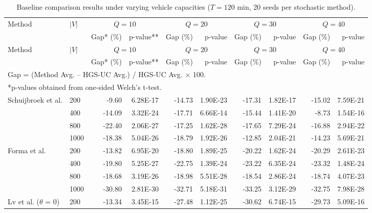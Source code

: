 \documentclass[11pt]{article}
\numberwithin{table}{section}
\numberwithin{figure}{section}
\begin{document}
\begin{landscape}
\begin{longtable}{p{4.2cm}lrrrrrrrr}
\caption{Baseline comparison results under varying vehicle capacities ($T=120$ min, 20 seeds per stochastic method).}\label{tab:baseline-capacity}\\
\toprule
\multirow{2}{*}{Method} & \multirow{2}{*}{$|V|$} & \multicolumn{2}{c}{$Q=10$} & \multicolumn{2}{c}{$Q=20$} & \multicolumn{2}{c}{$Q=30$} & \multicolumn{2}{c}{$Q=40$} \\
\cmidrule(lr){3-4}\cmidrule(lr){5-6}\cmidrule(lr){7-8}\cmidrule(lr){9-10}
& & Gap* (\%) & p-value** & Gap (\%) & p-value & Gap (\%) & p-value & Gap (\%) & p-value \\
\midrule
\endfirsthead
\toprule
\multirow{2}{*}{Method} & \multirow{2}{*}{$|V|$} & \multicolumn{2}{c}{$Q=10$} & \multicolumn{2}{c}{$Q=20$} & \multicolumn{2}{c}{$Q=30$} & \multicolumn{2}{c}{$Q=40$} \\
\cmidrule(lr){3-4}\cmidrule(lr){5-6}\cmidrule(lr){7-8}\cmidrule(lr){9-10}
& & Gap* (\%) & p-value** & Gap (\%) & p-value & Gap (\%) & p-value & Gap (\%) & p-value \\
\midrule
\endhead
\bottomrule
\multicolumn{10}{l}{\footnotesize *Gap = (Method Avg. -- HGS-UC Avg.) / HGS-UC Avg. $\times$ 100.}\\
\multicolumn{10}{l}{\footnotesize **p-values obtained from one-sided Welch's t-test.}\\
\endfoot
Schuijbroek et al. & 200 & -9.60 & 6.28E-17 & -14.73 & 1.90E-23 & -17.31 & 1.82E-17 & -15.02 & 7.59E-21 \\
 & 400 & -14.09 & 3.32E-24 & -17.71 & 6.66E-14 & -15.44 & 1.41E-20 & -8.73 & 1.54E-16 \\
 & 800 & -22.40 & 2.06E-27 & -17.25 & 1.62E-28 & -17.65 & 7.29E-24 & -16.88 & 2.94E-22 \\
 & 1000 & -18.38 & 5.04E-26 & -18.79 & 1.92E-26 & -12.85 & 2.04E-21 & -14.23 & 5.69E-21 \\
\midrule
Forma et al. & 200 & -13.82 & 6.95E-20 & -18.80 & 1.89E-25 & -20.22 & 1.62E-24 & -20.29 & 2.61E-23 \\
 & 400 & -19.80 & 5.25E-27 & -22.75 & 1.39E-24 & -23.22 & 6.35E-24 & -23.32 & 1.48E-24 \\
 & 800 & -18.68 & 3.19E-26 & -18.98 & 5.51E-28 & -18.54 & 2.86E-24 & -18.74 & 4.07E-23 \\
 & 1000 & -30.80 & 2.81E-30 & -32.71 & 5.18E-31 & -33.25 & 3.12E-29 & -32.75 & 7.98E-28 \\
\midrule
Lv et al. ($\theta$ = 0) & 200 & -13.34 & 3.45E-15 & -27.48 & 1.12E-25 & -30.62 & 6.74E-15 & -29.73 & 5.09E-16 \\

\end{longtable}
\end{landscape}
\end{document}
